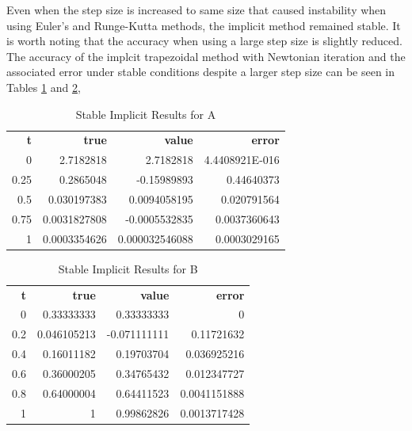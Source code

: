 \documentclass{article}
\begin{document}
Even when the step size is increased to same size that caused instability when using Euler's and Runge-Kutta methods, the implicit method remained stable. It is worth noting that the accuracy when using a large step size is slightly reduced. The accuracy of the implcit trapezoidal method with Newtonian iteration and the associated error under stable conditions despite a larger step size can be seen in Tables \ref{tab:un_a_implicit} and \ref{tab:un_b_implicit},

\begin{table}[H]
\footnotesize
\centering
\caption{Stable Implicit Results for A}
\label{tab:un_a_implicit}
\begin{tabular}{rrrr}
\textbf{t} & \textbf{true} & \textbf{value} & \textbf{error} \\
0          & 2.7182818     & 2.7182818      & 4.4408921E-016 \\
0.25       & 0.2865048     & -0.15989893    & 0.44640373     \\
0.5        & 0.030197383   & 0.0094058195   & 0.020791564    \\
0.75       & 0.0031827808  & -0.0005532835  & 0.0037360643   \\
1          & 0.0003354626  & 0.000032546088 & 0.0003029165   
\end{tabular}
\end{table}

\begin{table}[H]
\footnotesize
\centering
\caption{Stable Implicit Results for B}
\label{tab:un_b_implicit}
\begin{tabular}{rrrr}
\textbf{t} & \textbf{true} & \textbf{value} & \textbf{error} \\
0          & 0.33333333    & 0.33333333     & 0              \\
0.2        & 0.046105213   & -0.071111111   & 0.11721632     \\
0.4        & 0.16011182    & 0.19703704     & 0.036925216    \\
0.6        & 0.36000205    & 0.34765432     & 0.012347727    \\
0.8        & 0.64000004    & 0.64411523     & 0.0041151888   \\
1          & 1             & 0.99862826     & 0.0013717428  
\end{tabular}
\end{table}
\end{document}
